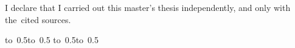 \section*{}

\vfill

I declare that I carried out this master's thesis independently, and only with the~cited
sources.

\vspace{10mm}

\hbox{\hbox to 0.5\hbox to 0.5\textwidth{\dotfill\quad}}
\smallskip
\hbox{\hbox to 0.5\textwidth{}\hbox to 0.5\textwidth{\hfil \ThesisAuthor \hfil}}

\vspace{20mm}